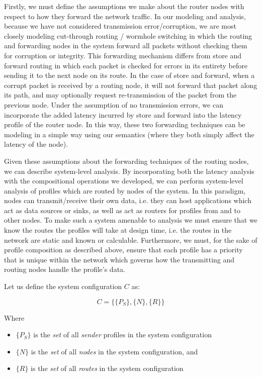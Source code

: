 Firstly, we must define the assumptions we make about the router nodes
with respect to how they forward the network traffic.  In our modeling
and analysis, because we have not considered transmission
error/corruption, we are most closely modeling cut-through routing /
wormhole switching in which the routing and forwarding nodes in the
system forward all packets without checking them for corruption or
integrity.  This forwarding mechanism differs from store and forward
routing in which each packet is checked for errors in its entirety
before sending it to the next node on its route.  In the case of store
and forward, when a corrupt packet is received by a routing node, it
will not forward that packet along its path, and may optionally
request re-transmission of the packet from the previous node.  Under
the assumption of no transmission errors, we can incorporate the added
latency incurred by store and forward into the latency profile of the
router node.  In this way, these two forwarding techniques can be
modeling in a simple way using our semantics (where they both simply
affect the latency of the node).  

Given these assumptions about the forwarding techniques of the routing
nodes, we can describe system-level analysis.  By incorporating both
the latency analysis with the compositional operations we developed,
we can perform system-level analysis of profiles which are routed by
nodes of the system.  In this paradigm, nodes can transmit/receive
their own data, i.e. they can host applications which act as data
sources or sinks, as well as act as routers for profiles from and to
other nodes.  To make such a system amenable to analysis we must
ensure that we know the routes the profiles will take at design time,
i.e. the routes in the network are static and known or calculable.
Furthermore, we must, for the sake of profile composition as described
above, ensure that each profile has a priority that is unique within
the network which governs how the transmitting and routing nodes
handle the profile's data.

Let us define the system configuration $C$ as:

\begin{equation}
  C = \{\{P_S\},\{N\},\{R\}\}
\end{equation}

Where

\begin{itemize}
\item $\{P_S\}$ is the \emph{set} of all \emph{sender} profiles in the system
  configuration
\item $\{N\}$ is the \emph{set} of all \emph{nodes} in the system configuration, and
\item $\{R\}$ is the \emph{set} of all \emph{routes} in the system configuration
\end{itemize}

